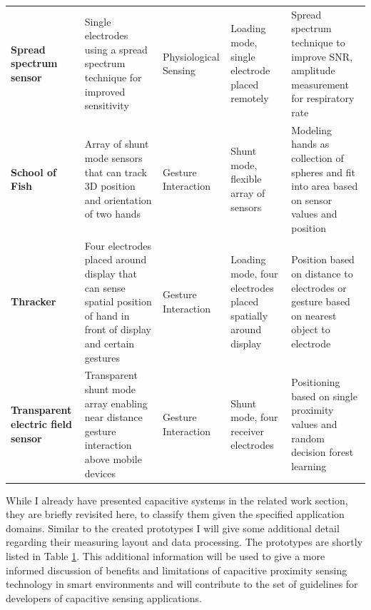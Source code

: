 \begin{table}[htbp]
\begin{tabularx}{\linewidth}{Xp{3.5cm}Xp{3.5cm}p{3.5cm}}
    \textbf{Spread spectrum sensor \cite{MacLachlan2004}} & Single electrodes using a spread spectrum technique for improved sensitivity & Physiological Sensing & Loading mode, single electrode placed remotely & Spread spectrum technique to improve SNR, amplitude measurement for respiratory rate \\
    \textbf{School of Fish \cite{smith1999thesis}} & Array of shunt mode sensors that can track 3D position and orientation of two hands  & Gesture Interaction & Shunt mode, flexible array of sensors & Modeling hands as collection of spheres and fit into area based on sensor values and position \\
    \textbf{Thracker \cite{Wimmer2006}} & Four electrodes placed around display that can sense spatial position of hand in front of display and certain gestures & Gesture Interaction & Loading mode, four electrodes placed spatially around display & Position based on distance to electrodes or gesture based on nearest object to electrode \\
    \textbf{Transparent electric field sensor \cite{le2014low}} & Transparent shunt mode array enabling near distance gesture interaction above mobile devices & Gesture Interaction & Shunt mode, four receiver electrodes & Positioning based on single proximity values and random decision forest learning \\
    \bottomrule
    \end{tabularx}%
  \label{tab:related_cap_proto}%
\end{table}%

While I already have presented capacitive systems in the related work section, they are briefly revisited here, to classify them given the specified application domains. Similar to the created prototypes I will give some additional detail regarding their measuring layout and data processing. The prototypes are shortly listed in Table \ref{tab:related_cap_proto}. This additional information will be used to give a more informed discussion of benefits and limitations of capacitive proximity sensing technology in smart environments and will contribute to the set of guidelines for developers of capacitive sensing applications.

